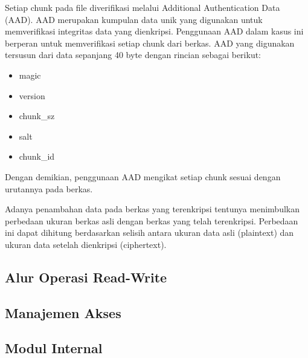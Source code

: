 Setiap chunk pada file diverifikasi melalui Additional Authentication Data (AAD). AAD merupakan kumpulan data unik yang digunakan untuk memverifikasi integritas data yang dienkripsi. Penggunaan AAD dalam kasus ini berperan untuk memverifikasi setiap chunk dari berkas. AAD yang digunakan tersusun dari data sepanjang 40 byte dengan rincian sebagai berikut:

\begin{itemize}
    \item magic
    \item version
    \item chunk\_sz
    \item salt
    \item chunk\_id
\end{itemize}

Dengan demikian, penggunaan AAD mengikat setiap chunk sesuai dengan urutannya pada berkas.

Adanya penambahan data pada berkas yang terenkripsi tentunya menimbulkan perbedaan ukuran berkas asli dengan berkas yang telah terenkripsi. Perbedaan ini dapat dihitung berdasarkan selisih antara ukuran data asli (plaintext) dan ukuran data setelah dienkripsi (ciphertext). 

\subsection{Alur Operasi Read-Write}
\lipsum[2]

\subsection{Manajemen Akses}
\lipsum[2]

\subsection{Modul Internal}
\lipsum[2]

